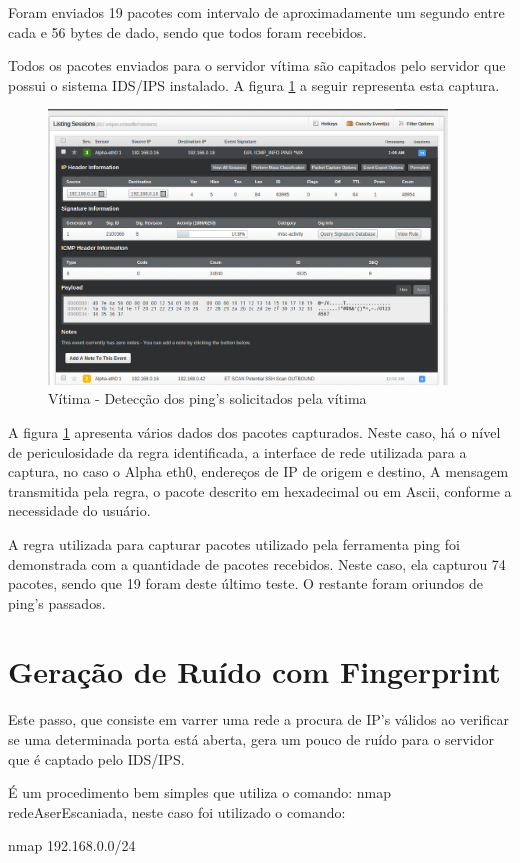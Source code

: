 Foram enviados 19 pacotes com intervalo de aproximadamente um segundo entre cada e
56 bytes de dado, sendo que todos foram recebidos.

 Todos os pacotes enviados para o servidor vítima são capitados pelo servidor
 que possui o sistema IDS/IPS instalado. A figura \ref{fig:ping_servidor} a seguir representa
 esta captura.

	\begin{figure}[h]
	 \centering
	 \includegraphics[width=400px, scale=1]{resource/ping_servidor}
	 \caption{Vítima - Detecção dos ping's solicitados pela vítima}
 \label{fig:ping_servidor}
 \end{figure}

 A figura \ref{fig:ping_servidor} apresenta vários dados dos pacotes capturados.
 Neste caso, há o nível de periculosidade da regra identificada, a interface de rede
 utilizada para a captura, no caso o Alpha eth0, endereços de IP de origem e destino,
 A mensagem transmitida pela regra, o pacote descrito em hexadecimal ou em
 Ascii, conforme a necessidade do usuário.

 A regra utilizada para capturar pacotes utilizado pela ferramenta ping
 foi demonstrada com a quantidade de pacotes recebidos. Neste caso, ela capturou
 74 pacotes, sendo que 19 foram deste último teste. O restante foram oriundos de ping's
 passados.

 \section{Geração de Ruído com Fingerprint}
Este passo, que consiste em varrer uma rede a procura de IP's válidos ao verificar
se uma determinada porta está aberta, gera um pouco de ruído para o servidor que é
captado pelo IDS/IPS.

É um procedimento bem simples que utiliza o comando: nmap redeAserEscaniada, neste
caso foi utilizado o comando:
\begin{framed}
 nmap 192.168.0.0/24
\end{framed}

